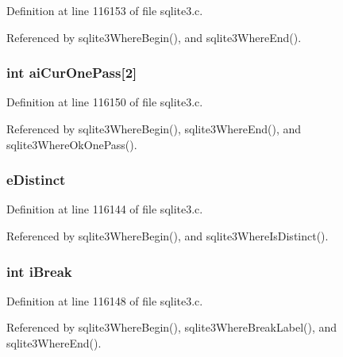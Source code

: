 Definition at line 116153 of file sqlite3.\+c.



Referenced by sqlite3\+Where\+Begin(), and sqlite3\+Where\+End().

\hypertarget{struct_where_info_af78e25c217cb5a4e878c8abcf26cbf74}{}
\subsubsection[{ai\+Cur\+One\+Pass}]{\setlength{\rightskip}{0pt plus 5cm}int ai\+Cur\+One\+Pass\mbox{[}2\mbox{]}}\label{struct_where_info_af78e25c217cb5a4e878c8abcf26cbf74}


Definition at line 116150 of file sqlite3.\+c.



Referenced by sqlite3\+Where\+Begin(), sqlite3\+Where\+End(), and sqlite3\+Where\+Ok\+One\+Pass().

\hypertarget{struct_where_info_afe5ecc400155291a3822ea56569b83e3}{}
\subsubsection[{e\+Distinct}]{ e\+Distinct}\label{struct_where_info_afe5ecc400155291a3822ea56569b83e3}


Definition at line 116144 of file sqlite3.\+c.



Referenced by sqlite3\+Where\+Begin(), and sqlite3\+Where\+Is\+Distinct().

\hypertarget{struct_where_info_a7f3109c33d52f125acf777d385290bc2}{}
\subsubsection[{i\+Break}]{\setlength{\rightskip}{0pt plus 5cm}int i\+Break}\label{struct_where_info_a7f3109c33d52f125acf777d385290bc2}


Definition at line 116148 of file sqlite3.\+c.



Referenced by sqlite3\+Where\+Begin(), sqlite3\+Where\+Break\+Label(), and sqlite3\+Where\+End().

